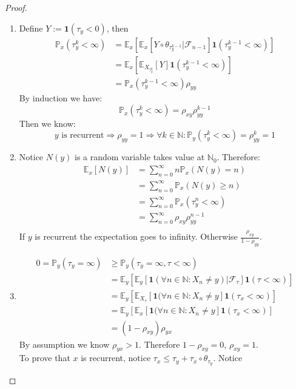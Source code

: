  \begin{proof}\quad
 \begin{enumerate}
 	\item Define $Y:= \textbf{1}(\tau_y < 0)$, then
 	\begin{align*}
 		\mathbb{P}_x(\tau_y^k < \infty) &= \mathbb{E}_x[ \mathbb{E}_x[Y\circ\theta_{\tau^{k-1}_y}|\mathcal{F}_{n-1}]\textbf{1}(\tau_y^{k-1}< \infty)]\\
 		&= \mathbb{E}_x[\mathbb{E}_{X_{\tau_y^k}}[Y]\textbf{1}(\tau_y^{k-1} < \infty)]\\
 		&= \mathbb{P}_x(\tau_y^{k-1} < \infty)\rho_{yy}
 	\end{align*}
 	By induction we have:
 	\begin{equation*}
 		\mathbb{P}_x(\tau_y^{k}< \infty) = \rho_{xy} \rho_{yy}^{k-1}
 	\end{equation*}
 	Then we know:
 	\begin{equation*}
 		\text{$y$ is recurrent} \Rightarrow \rho_{yy} = 1 \Rightarrow \forall k \in \mathbb{N}: \mathbb{P}_y(\tau_y^k < \infty) = \rho_{yy}^k = 1
 	\end{equation*}
 	
 	\item Notice $N(y)$ is a random variable takes value at $\mathbb{N}_0$. Therefore:
 	\begin{align*}
 		\mathbb{E}_x[N(y)] &= \sum_{n = 0}^\infty n \mathbb{P}_x(N(y) = n)\\
 		&= \sum_{n = 0}^\infty \mathbb{P}_x(N(y) \geq n)\\
 		&= \sum_{n = 0}^\infty \mathbb{P}_x(\tau_y^n < \infty)\\
 		&= \sum_{n = 0}^\infty \rho_{xy}\rho_{yy}^{n-1}\\
 	\end{align*}
 	If $y$ is recurrent the expectation goes to infinity. Otherwise $\frac{\rho_{xy}}{1-\rho_{yy}}$.
 	
 	\item 
 	\begin{align*}
 		0 = \mathbb{P}_y(\tau_y = \infty) &\geq \mathbb{P}_y(\tau_y = \infty, \tau < \infty)\\
 		&= \mathbb{E}_y[\mathbb{E}_y[\textbf{1}(\forall n \in \mathbb{N}: X_n \neq y) | \mathcal{F}_\tau] \textbf{1}(\tau < \infty)]\\
 		&= \mathbb{E}_y[\mathbb{E}_{X_\tau}[\textbf{1}(\forall n \in \mathbb{N}: X_n \neq y]\textbf{1}(\tau_x < \infty)]\\
 		&= \mathbb{E}_y[\mathbb{E}_x[\textbf{1}(\forall n \in \mathbb{N}: X_n \neq y]\textbf{1}(\tau_x < \infty)]\\
 		&= (1- \rho_{xy})\rho_{yx}
 	\end{align*}
 	By assumption we know $\rho_{yx} > 1$. Therefore $1 - \rho_{xy} = 0$, $\rho_{xy} = 1$.\\
 	To prove that $x$ is recurrent, notice $\tau_x \leq \tau_y + \tau_x \circ \theta_{\tau_y}$. Notice
 \end{enumerate}
 \end{proof}
 
